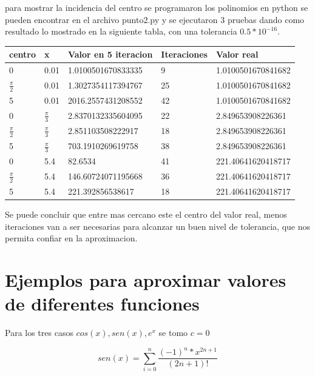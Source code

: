 \documentclass[12pt]{article}
\begin{document}
        para mostrar la incidencia del centro se programaron los polinomios en python se pueden
        encontrar en el archivo punto2.py y se ejecutaron 3 pruebas dando como resultado lo 
        mostrado en la siguiente tabla, con una tolerancia $0.5*10^{-16}$.
        \begin{center}
            \begin{tabular}{|l|l|l|l|l|} \hline
            centro & x & Valor en 5 iteracion & Iteraciones & Valor real\\
            \hline \hline
            0 & 0.01 &  1.0100501670833335 & 9  & 1.0100501670841682\\
            \hline 
            $\frac{\pi}{2}$ & 0.01 & 1.3027354117394767 & 25 & 1.0100501670841682\\
            \hline
            5 & 0.01 & 2016.2557431208552 & 42 & 1.0100501670841682\\
            \hline
            0 &$\frac{\pi}{3}$ &  2.8370132335604095 & 22 & 2.849653908226361\\
            \hline 
            $\frac{\pi}{2}$ & $\frac{\pi}{3}$ & 2.851103508222917 & 18 & 2.849653908226361\\
            \hline
            5 & $\frac{\pi}{3}$ & 703.1910269619758 & 38 & 2.849653908226361\\
            \hline
            0 & 5.4 &  82.6534  & 41 & 221.40641620418717\\
            \hline 
            $\frac{\pi}{2}$ & 5.4 & 146.60724071195668 & 36 & 221.40641620418717 \\
            \hline
            5 & 5.4 & 221.392856538617 & 18 & 221.40641620418717\\
            \hline
            \end{tabular}
        \end{center}

        Se puede concluir que entre mas cercano este el centro del valor real, menos iteraciones van a ser necesarias
        para alcanzar un buen nivel de tolerancia, que nos permita confiar en la aproximacion.
    
    \section {Ejemplos para aproximar valores de diferentes funciones}
    Para los tres casos $cos(x), sen(x), e^{x}$ se tomo $c = 0$
    
        \begin{equation}
            sen(x) = \sum_{i=0}^{n} \frac{(-1)^{n} * x^{2n + 1}}{(2n + 1)!}
        \end{equation}
        
\end{document}
